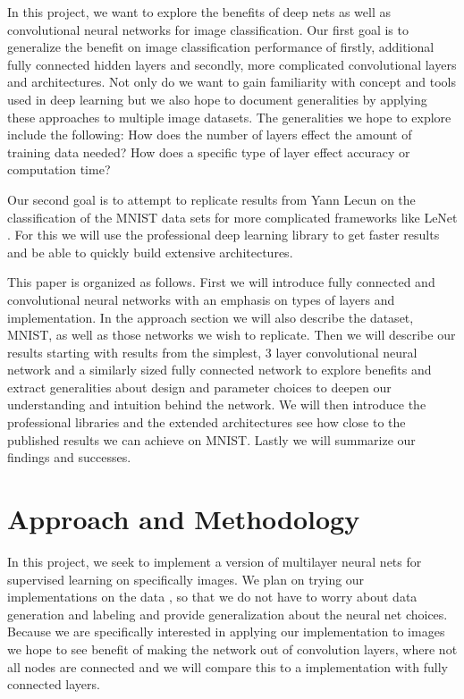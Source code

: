 \documentclass[12pt, twocolumn]{article}
\begin{document}
In this project, we want to explore the benefits of deep nets as well as convolutional neural networks for image classification.  Our first goal is to generalize the benefit on image classification performance of firstly, additional fully connected hidden layers and secondly, more complicated convolutional layers and architectures. Not only do we want to gain familiarity with concept and tools used in deep learning but we also hope to document generalities by applying these approaches to multiple image datasets. The generalities we hope to explore include the following: How does the number of layers effect the amount of training data needed? How does a specific type of layer effect accuracy  or computation time? 

Our second goal is to attempt to replicate results from Yann Lecun on the classification of the MNIST data sets for more complicated frameworks like LeNet \cite{LeCun1998}. For this we will use the professional deep learning library to get faster results and be able to quickly build extensive architectures. 

This paper is organized as follows. First we will introduce fully connected and convolutional neural networks with an emphasis on types of layers and implementation. In the approach section we will also describe the dataset, MNIST, as well as those networks we wish to replicate.  Then we will describe our results starting with  results from the simplest, 3 layer convolutional neural network and a similarly sized fully connected network to explore benefits and extract generalities about design and parameter choices to deepen our understanding and intuition behind the network. We will then introduce the professional libraries and the extended architectures see how close to the published results we can achieve on MNIST. Lastly we will summarize our findings and successes.

\section{Approach and Methodology}
	
In this project, we seek to implement a version of multilayer neural nets for supervised learning on specifically images. We plan on trying our implementations on the data , so that we do not have to worry about data generation and labeling and provide generalization about the neural net choices. Because we are specifically interested in applying our implementation to images we hope to see benefit of making the network out of convolution layers, where not all nodes are connected and we will compare this to a implementation with fully connected layers.
\end{document}
